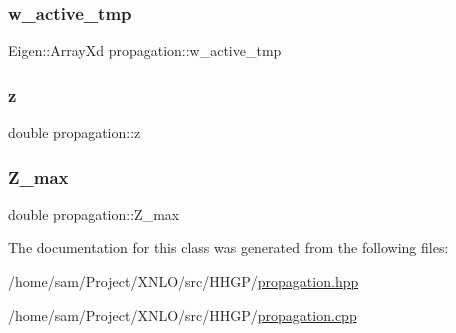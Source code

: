\subsubsection{\texorpdfstring{w\_active\_tmp}{w\_active\_tmp}}
{\footnotesize\ttfamily Eigen\+::\+Array\+Xd propagation\+::w\+\_\+active\+\_\+tmp\hspace{0.3cm}{\ttfamily [private]}}

\mbox{\label{classpropagation_aeacfc091fafd1fdb1af4536f6f587e55}} 
\subsubsection{\texorpdfstring{z}{z}}
{\footnotesize\ttfamily double propagation\+::z}

\mbox{\label{classpropagation_ae0b2d1a8fa0e59d37e124a0ba1f12dd2}} 
\subsubsection{\texorpdfstring{Z\_max}{Z\_max}}
{\footnotesize\ttfamily double propagation\+::\+Z\+\_\+max\hspace{0.3cm}{\ttfamily [private]}}



The documentation for this class was generated from the following files\+:\begin{DoxyCompactItemize}
\item 
/home/sam/\+Project/\+X\+N\+L\+O/src/\+H\+H\+G\+P/\mbox{\hyperlink{propagation_8hpp}{propagation.\+hpp}}\item 
/home/sam/\+Project/\+X\+N\+L\+O/src/\+H\+H\+G\+P/\mbox{\hyperlink{propagation_8cpp}{propagation.\+cpp}}\end{DoxyCompactItemize}
